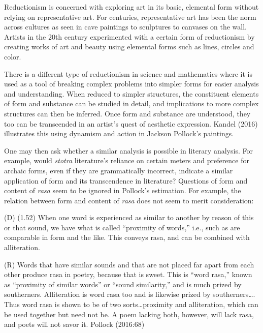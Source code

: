 Reductionism is concerned with exploring art in its basic, elemental form without relying on representative art. For centuries, representative art has been the norm across cultures as seen in cave paintings to sculptures to canvases on the wall. Artists in the 20th century experimented with a certain form of reductionism by creating works of art and beauty using elemental forms such as lines, circles and color. 


\newpage

There is a different type of reductionism in science and mathematics where it is used as a tool of breaking complex problems into simpler forms for easier analysis and understanding. When reduced to simpler structures, the constituent elements of form and substance can be studied in detail, and implications to more complex structures can then be inferred. Once form and substance are understood, they too can be transcended in an artist’s quest of aesthetic expression. Kandel (2016) illustrates this using dynamism and action in Jackson Pollock’s paintings. 

One may then ask whether a similar analysis is possible in literary analysis. For example, would \textsl{stotra} literature’s reliance on certain meters and preference for archaic forms, even if they are grammatically incorrect, indicate a similar application of form and its transcendence in literature? Questions of form and content of \textsl{rasa} seem to be ignored in Pollock’s estimation. For example, the relation between form and content of \textsl{rasa} does not seem to merit consideration:

\begin{myquote}
(D) (1.52) When one word is experienced as similar to another by reason of this or that sound, we have what is called “proximity of words,” i.e., such as are comparable in form and the like. This conveys rasa, and can be combined with alliteration.

(R) Words that have similar sounds and that are not placed far apart from each other produce rasa in poetry, because that is sweet. This is “word rasa,” known as “proximity of similar words” or “sound similarity,” and is much prized by southerners. Alliteration is word rasa too and is likewise prized by southerners…. Thus word rasa is shown to be of two sorts…proximity and alliteration, which can be used together but need not be. A poem lacking both, however, will lack rasa, and poets will not savor it.
\hfill Pollock (2016:68)
\end{myquote}

